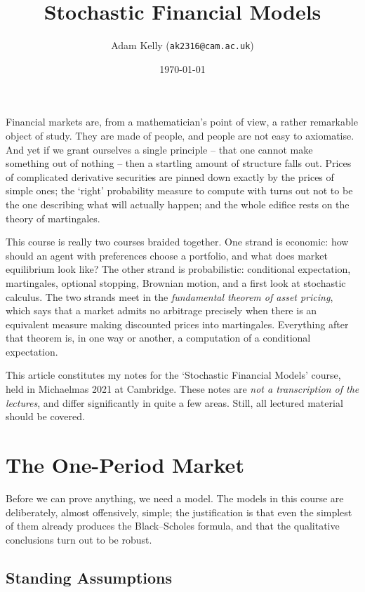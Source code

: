 \documentclass[a4paper]{scrartcl}
\title{Stochastic Financial Models}
\author{Adam Kelly (\texttt{ak2316@cam.ac.uk})}
\date{\today}
\begin{document}
\maketitle

Financial markets are, from a mathematician's point of view, a rather remarkable object of study. They are made of people, and people are not easy to axiomatise. And yet if we grant ourselves a single principle -- that one cannot make something out of nothing -- then a startling amount of structure falls out. Prices of complicated derivative securities are pinned down exactly by the prices of simple ones; the `right' probability measure to compute with turns out not to be the one describing what will actually happen; and the whole edifice rests on the theory of martingales.

This course is really two courses braided together. One strand is economic: how should an agent with preferences choose a portfolio, and what does market equilibrium look like? The other strand is probabilistic: conditional expectation, martingales, optional stopping, Brownian motion, and a first look at stochastic calculus. The two strands meet in the \emph{fundamental theorem of asset pricing}, which says that a market admits no arbitrage precisely when there is an equivalent measure making discounted prices into martingales. Everything after that theorem is, in one way or another, a computation of a conditional expectation.

This article constitutes my notes for the `Stochastic Financial Models' course, held in Michaelmas 2021 at Cambridge. These notes are \emph{not a transcription of the lectures}, and differ significantly in quite a few areas. Still, all lectured material should be covered.

\tableofcontents

\clearpage

\section{The One-Period Market}

Before we can prove anything, we need a model. The models in this course are deliberately, almost offensively, simple; the justification is that even the simplest of them already produces the Black--Scholes formula, and that the qualitative conclusions turn out to be robust.

\subsection{Standing Assumptions}
\end{document}
